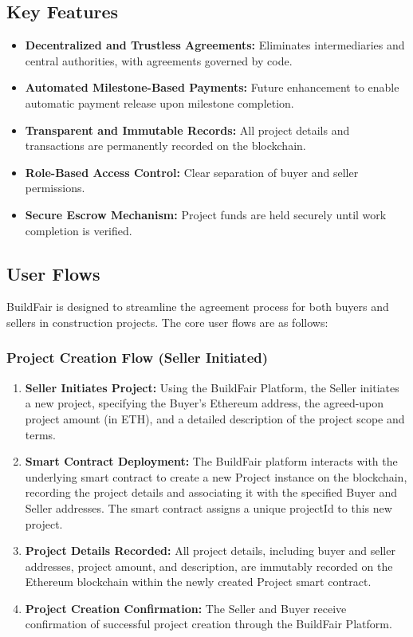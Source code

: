 \documentclass[12pt]{article}
\begin{document}
\subsection{Key Features}
\begin{itemize}
    \item \textbf{Decentralized and Trustless Agreements:} Eliminates intermediaries and central authorities, with agreements governed by code.
    \item \textbf{Automated Milestone-Based Payments:} Future enhancement to enable automatic payment release upon milestone completion.
    \item \textbf{Transparent and Immutable Records:} All project details and transactions are permanently recorded on the blockchain.
    \item \textbf{Role-Based Access Control:} Clear separation of buyer and seller permissions.
    \item \textbf{Secure Escrow Mechanism:} Project funds are held securely until work completion is verified.
\end{itemize}

\subsection{User Flows}
BuildFair is designed to streamline the agreement process for both buyers and sellers in construction projects. The core user flows are as follows:

\subsubsection{Project Creation Flow (Seller Initiated)}
\begin{enumerate}[label=\arabic*.]
    \item \textbf{Seller Initiates Project:} Using the BuildFair Platform, the Seller initiates a new project, specifying the Buyer's Ethereum address, the agreed-upon project amount (in ETH), and a detailed description of the project scope and terms.
    
    \item \textbf{Smart Contract Deployment:} The BuildFair platform interacts with the underlying smart contract to create a new Project instance on the blockchain, recording the project details and associating it with the specified Buyer and Seller addresses. The smart contract assigns a unique projectId to this new project.
    
    \item \textbf{Project Details Recorded:} All project details, including buyer and seller addresses, project amount, and description, are immutably recorded on the Ethereum blockchain within the newly created Project smart contract.
    
    \item \textbf{Project Creation Confirmation:} The Seller and Buyer receive confirmation of successful project creation through the BuildFair Platform.
\end{enumerate}
\end{document}
